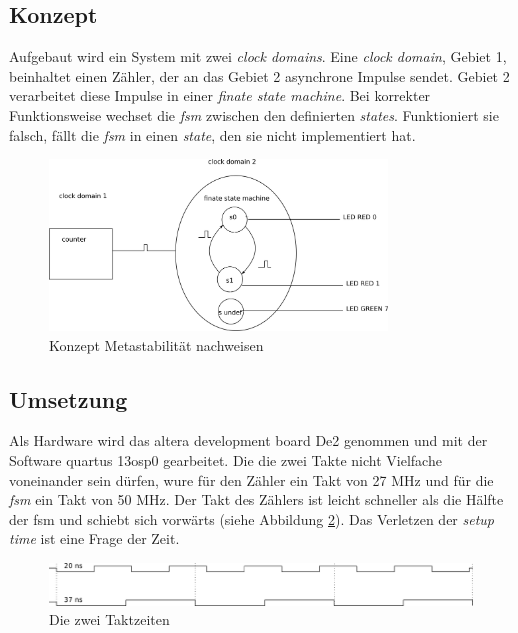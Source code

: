 \subsection{Konzept}\label{sect.metastabil_ansatz}
Aufgebaut wird ein System mit zwei \textit{clock domains}. Eine \textit{clock domain}, Gebiet 1,  beinhaltet einen Zähler, der an das Gebiet 2 asynchrone Impulse sendet. Gebiet 2 verarbeitet diese Impulse in einer \textit{finate state machine}. Bei korrekter Funktionsweise wechset die \textit{fsm} zwischen den definierten \textit{states}. Funktioniert sie falsch, fällt die \textit{fsm} in einen \textit{state}, den sie nicht implementiert hat.\\

\begin{figure}[H]
	\centering
	\includegraphics[width=0.8\textwidth]{images/metastability/konzept.png}
	\caption{Konzept Metastabilität nachweisen}
	\label{fig.metastabil.fsm}
\end{figure}


\subsection{Umsetzung}\label{sect.metastabil_implementation}
Als Hardware wird das altera development board De2 genommen und mit der Software quartus 13osp0 gearbeitet. Die die zwei Takte nicht Vielfache voneinander sein dürfen, wure für den Zähler ein Takt von 27 MHz und für die \textit{fsm} ein Takt von 50 MHz. Der Takt des Zählers ist leicht schneller als die Hälfte der fsm und schiebt sich  vorwärts (siehe Abbildung \ref{fig.metastabil.takte}). Das Verletzen der \textit{setup time} ist eine Frage der Zeit.

\begin{figure}[H]
	\centering
	\includegraphics[width=1\textwidth]{images/metastability/2_takte.png}
	\caption{Die zwei Taktzeiten}
	\label{fig.metastabil.takte}
\end{figure}

